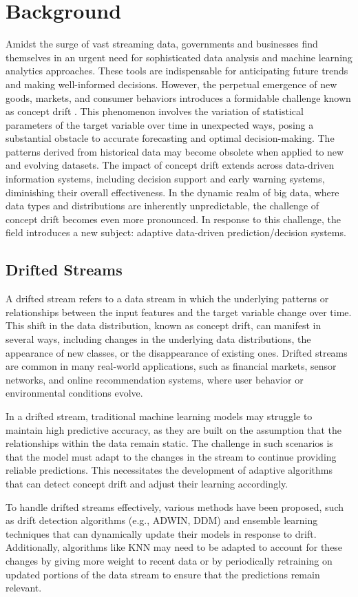 \chapter{Background}\label{cha:2_background}

Amidst the surge of vast streaming data, governments and businesses find themselves in an urgent need for sophisticated data analysis and machine learning analytics approaches. These tools are indispensable for anticipating future trends and making well-informed decisions. However, the perpetual emergence of new goods, markets, and consumer behaviors introduces a formidable challenge known as concept drift \cite{widmer1996learning}. This phenomenon involves the variation of statistical parameters of the target variable over time in unexpected ways, posing a substantial obstacle to accurate forecasting and optimal decision-making. The patterns derived from historical data may become obsolete when applied to new and evolving datasets.
The impact of concept drift extends across data-driven information systems, including decision support and early warning systems, diminishing their overall effectiveness. In the dynamic realm of big data, where data types and distributions are inherently unpredictable, the challenge of concept drift becomes even more pronounced. In response to this challenge, the field introduces a new subject: adaptive data-driven prediction/decision systems.

\section{Drifted Streams}
A drifted stream refers to a data stream in which the underlying patterns or relationships between the input features and the target variable change over time. This shift in the data distribution, known as concept drift, can manifest in several ways, including changes in the underlying data distributions, the appearance of new classes, or the disappearance of existing ones. Drifted streams are common in many real-world applications, such as financial markets, sensor networks, and online recommendation systems, where user behavior or environmental conditions evolve.

In a drifted stream, traditional machine learning models may struggle to maintain high predictive accuracy, as they are built on the assumption that the relationships within the data remain static. The challenge in such scenarios is that the model must adapt to the changes in the stream to continue providing reliable predictions. This necessitates the development of adaptive algorithms that can detect concept drift and adjust their learning accordingly.

To handle drifted streams effectively, various methods have been proposed, such as drift detection algorithms (e.g., ADWIN, DDM) and ensemble learning techniques that can dynamically update their models in response to drift. Additionally, algorithms like KNN may need to be adapted to account for these changes by giving more weight to recent data or by periodically retraining on updated portions of the data stream to ensure that the predictions remain relevant.
